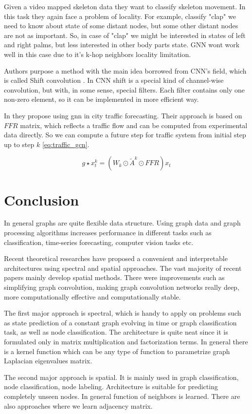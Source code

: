 Given a video mapped skeleton data they want to classify skeleton movement. In this task they again face a problem of locality. For example, classify "clap" we need to know about state of some distant nodes, but some other distant nodes are not as important. So, in case of "clap" we might be interested in states of left and right palms, but less interested in other body parts state. GNN wont work well in this case due to it's k-hop neighbors locality limitation.

Authors purpose a method with the main idea borrowed from CNN's field, which is called Shift convolution \cite{Wu_Wan_Yue_Jin_Zhao_Golmant_Gholaminejad_Gonzalez_Keutzer_2017}. In CNN shift is a special kind of channel-wise convolution, but with, in some sense, special filters. Each filter contains only one non-zero element, so it can be implemented in more efficient way.

In \cite{Cui_Henrickson_Ke_Wang_2020} they propose using gnn in city traffic forecasting. Their approach is based on $FFR$ matrix, which reflects a traffic flow and can be computed from experimental data directly. So we can compute a future step for traffic system from initial step up to step $k$ \ref{eq:traffic_gcn}.

\begin{equation}
    \label{eq:traffic_gcn}
    g\star x^k_t=(W_k\odot\tilde{A}^k\odot{FFR})x_t
\end{equation}

\chapter{Conclusion}

In general graphs are quite flexible data structure. Using graph data and graph processing algorithms increases performance in different tasks such as classification, time-series forecasting, computer vision tasks etc.

Recent theoretical researches have proposed a convenient and interpretable architectures using spectral and spatial approaches. The vast majority of recent papers mainly develop spatial methods. There were improvements such as simplifying graph convolution, making graph convolution networks really deep, more computationally effective and computationally stable.

The first major approach is spectral, which is handy to apply on problems such as state prediction of a constant graph evolving in time or graph classification task, as well as node classification. The architecture is quite neat since it is formulated only in matrix multiplication and factorization terms. In general there is a kernel function which can be any type of function to parametrize graph Laplacian eigenvalues matrix.

The second major approach is spatial. It is mainly used in graph classification, node classification, node labeling. Architecture is suitable for predicting completely unseen nodes. In general function of neighbors is learned. There are also approaches where we learn adjacency matrix.
